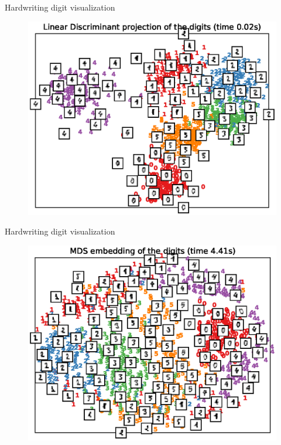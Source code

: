 \documentclass[10pt]{beamer}
\begin{document}
\begin{frame}{Hardwriting digit visualization}
\begin{figure}
\centering
\includegraphics[scale=0.65]{./image/experiment/lda.eps}
\end{figure}
\end{frame}

\begin{frame}{Hardwriting digit visualization}
\begin{figure}
\centering
\includegraphics[scale=0.65]{./image/experiment/mds.eps}
\end{figure}
\end{frame}
\end{document}
